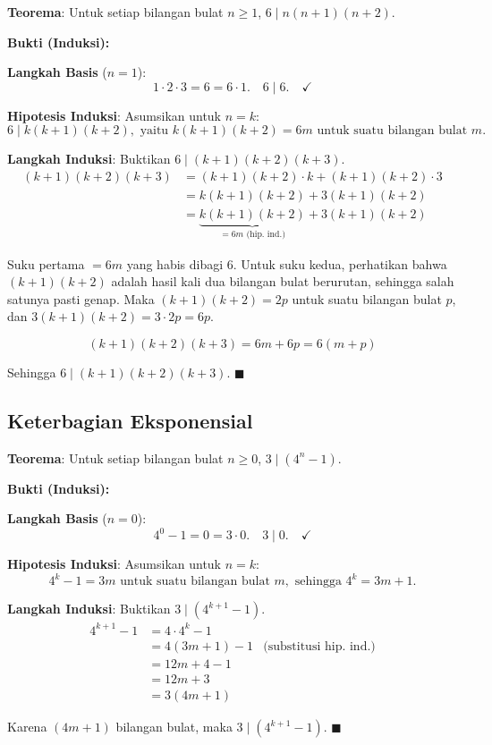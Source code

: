 \begin{contoh}
\textbf{Teorema}: Untuk setiap bilangan bulat $n \geq 1$, $6 \mid n(n+1)(n+2)$.

\textbf{Bukti (Induksi):}

\textbf{Langkah Basis} ($n = 1$):
\[ 1 \cdot 2 \cdot 3 = 6 = 6 \cdot 1. \quad 6 \mid 6. \quad \checkmark \]

\textbf{Hipotesis Induksi}: Asumsikan untuk $n = k$:
\[ 6 \mid k(k+1)(k+2), \text{ yaitu } k(k+1)(k+2) = 6m \text{ untuk suatu bilangan bulat } m. \]

\textbf{Langkah Induksi}: Buktikan $6 \mid (k+1)(k+2)(k+3)$.
\begin{align*}
(k+1)(k+2)(k+3) &= (k+1)(k+2) \cdot k + (k+1)(k+2) \cdot 3 \\
&= k(k+1)(k+2) + 3(k+1)(k+2) \\
&= \underbrace{k(k+1)(k+2)}_{= 6m \text{ (hip. ind.)}} + 3(k+1)(k+2)
\end{align*}

Suku pertama $= 6m$ yang habis dibagi 6. Untuk suku kedua, perhatikan bahwa $(k+1)(k+2)$ adalah hasil kali dua bilangan bulat berurutan, sehingga salah satunya pasti genap. Maka $(k+1)(k+2) = 2p$ untuk suatu bilangan bulat $p$, dan $3(k+1)(k+2) = 3 \cdot 2p = 6p$.

\[ (k+1)(k+2)(k+3) = 6m + 6p = 6(m + p) \]

Sehingga $6 \mid (k+1)(k+2)(k+3)$. $\blacksquare$
\end{contoh}

\subsection{Keterbagian Eksponensial}

\begin{contoh}
\textbf{Teorema}: Untuk setiap bilangan bulat $n \geq 0$, $3 \mid (4^n - 1)$.

\textbf{Bukti (Induksi):}

\textbf{Langkah Basis} ($n = 0$):
\[ 4^0 - 1 = 0 = 3 \cdot 0. \quad 3 \mid 0. \quad \checkmark \]

\textbf{Hipotesis Induksi}: Asumsikan untuk $n = k$:
\[ 4^k - 1 = 3m \text{ untuk suatu bilangan bulat } m, \text{ sehingga } 4^k = 3m + 1. \]

\textbf{Langkah Induksi}: Buktikan $3 \mid (4^{k+1} - 1)$.
\begin{align*}
4^{k+1} - 1 &= 4 \cdot 4^k - 1 \\
&= 4(3m + 1) - 1 & \text{(substitusi hip. ind.)} \\
&= 12m + 4 - 1 \\
&= 12m + 3 \\
&= 3(4m + 1)
\end{align*}

Karena $(4m + 1)$ bilangan bulat, maka $3 \mid (4^{k+1} - 1)$. $\blacksquare$
\end{contoh}

